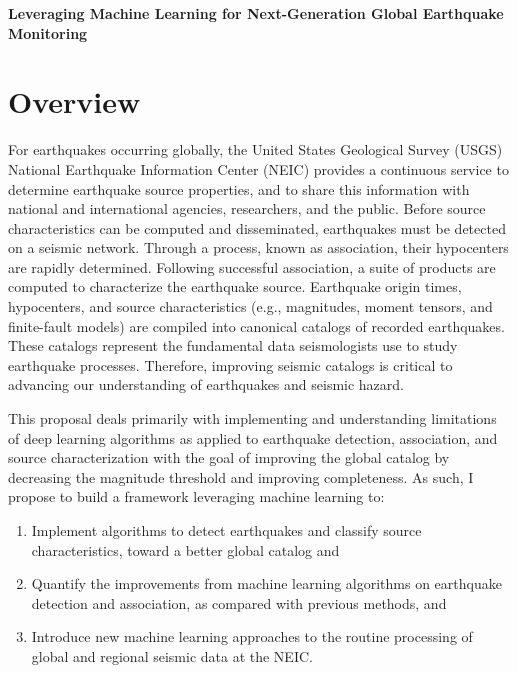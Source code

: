\documentclass[12p]{article}
\begin{document}
\begin{center}\Large\textbf{Leveraging Machine Learning for Next-Generation Global Earthquake Monitoring}\end{center}

\section{Overview}
For earthquakes occurring globally, the United States Geological Survey (USGS) National Earthquake Information Center
(NEIC) provides a continuous service to determine earthquake source properties, and to share this information with
national and international agencies, researchers, and the public. Before source characteristics can be computed and
disseminated, earthquakes must be detected on a seismic network. Through a process, known as association, their
hypocenters are rapidly determined. Following successful association, a suite of products are computed to characterize
the earthquake source. Earthquake origin times, hypocenters, and source characteristics (e.g., magnitudes, moment
tensors, and finite-fault models) are compiled into canonical catalogs of recorded earthquakes. These catalogs
represent the fundamental data seismologists use to study earthquake processes. Therefore, improving seismic catalogs
is critical to advancing our understanding of earthquakes and seismic hazard.

This proposal deals primarily with implementing and understanding limitations of deep learning algorithms as applied to
earthquake detection, association, and source characterization with the goal of improving the global catalog by
decreasing the magnitude threshold and improving completeness. As such, I propose to build a framework leveraging machine learning to:

\begin{enumerate}\bfseries
  \item Implement algorithms to detect earthquakes and classify source characteristics, toward a better global catalog
  and
  \item Quantify the improvements from machine learning algorithms on earthquake detection and association, as compared
  with previous methods, and
  \item Introduce new machine learning approaches to the routine processing of global and regional seismic data at the
  NEIC.
\end{enumerate}
\end{document}
